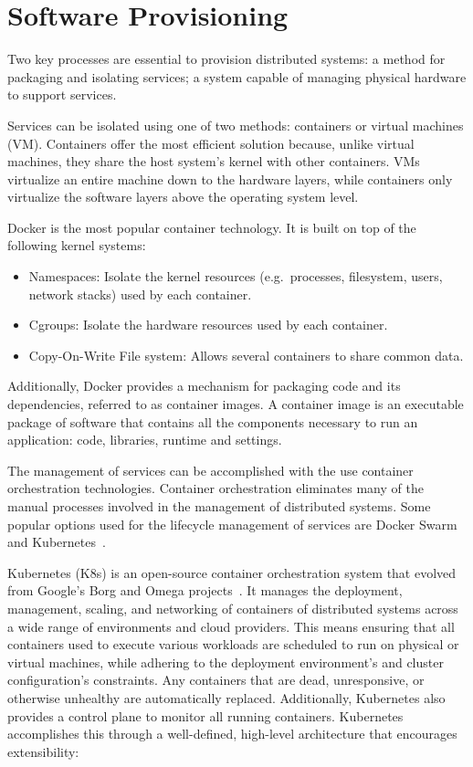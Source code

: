 \section{Software Provisioning} %
\label{sec:software_provisioning}

Two key processes are essential to provision distributed systems:
a method for packaging and isolating services;
a system capable of managing physical hardware to support services.

Services can be isolated using one of two methods: containers or virtual machines (VM).
Containers offer the most efficient solution because, unlike virtual machines, they share the host system's kernel with other containers.
VMs virtualize an entire machine down to the hardware layers, while containers only virtualize the software layers above the operating system level.

Docker \cite{docker} is the most popular container technology.
It is built on top of the following kernel systems:
\begin{itemize}
    \setlength\itemsep{0em}
    \item Namespaces: Isolate the kernel resources (e.g.\ processes, filesystem, users, network stacks) used by each container.
    \item Cgroups: Isolate the hardware resources used by each container.
    \item Copy-On-Write File system: Allows several containers to share common data.
\end{itemize}

Additionally, Docker provides a mechanism for packaging code and its dependencies, referred to as container images.
A container image is an executable package of software that contains all the components necessary to run an application: code, libraries, runtime and settings.

The management of services can be accomplished with the use container orchestration technologies.
Container orchestration eliminates many of the manual processes involved in the management of distributed systems.
Some popular options used for the lifecycle management of services are Docker Swarm~\cite{docker2016swarm} and Kubernetes~\cite{kubernetes}.

Kubernetes (K8s) is an open-source container orchestration system that evolved from Google's Borg and Omega projects~\cite{burns2016borg}.
It manages the deployment, management, scaling, and networking of containers of distributed systems across a wide range of environments
and cloud providers.
This means ensuring that all containers used to execute various workloads are scheduled to run on physical or virtual machines,
while adhering to the deployment environment's and cluster configuration's constraints.
Any containers that are dead, unresponsive, or otherwise unhealthy are automatically replaced.
Additionally, Kubernetes also provides a control plane to monitor all running containers.
Kubernetes accomplishes this through a well-defined, high-level architecture that encourages extensibility:

